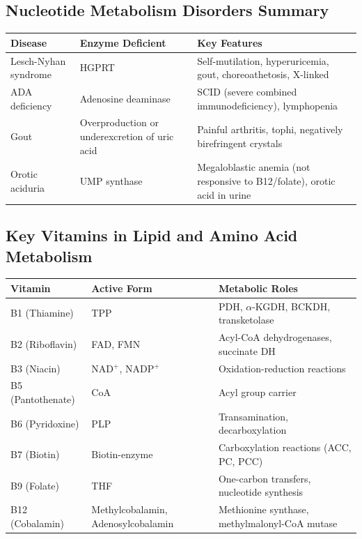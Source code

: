 \subsection{Nucleotide Metabolism Disorders Summary}

\begin{center}
\begin{tabular}{p{3.5cm}p{3.5cm}p{6.5cm}}
\toprule
\textbf{Disease} & \textbf{Enzyme Deficient} & \textbf{Key Features} \\
\midrule
Lesch-Nyhan syndrome & HGPRT & Self-mutilation, hyperuricemia, gout, choreoathetosis, X-linked \\
ADA deficiency & Adenosine deaminase & SCID (severe combined immunodeficiency), lymphopenia \\
Gout & Overproduction or underexcretion of uric acid & Painful arthritis, tophi, negatively birefringent crystals \\
Orotic aciduria & UMP synthase & Megaloblastic anemia (not responsive to B12/folate), orotic acid in urine \\
\bottomrule
\end{tabular}
\end{center}

\subsection{Key Vitamins in Lipid and Amino Acid Metabolism}

\begin{center}
\begin{tabular}{p{3cm}p{4cm}p{6.5cm}}
\toprule
\textbf{Vitamin} & \textbf{Active Form} & \textbf{Metabolic Roles} \\
\midrule
B1 (Thiamine) & TPP & PDH, $\alpha$-KGDH, BCKDH, transketolase \\
B2 (Riboflavin) & FAD, FMN & Acyl-CoA dehydrogenases, succinate DH \\
B3 (Niacin) & NAD$^+$, NADP$^+$ & Oxidation-reduction reactions \\
B5 (Pantothenate) & CoA & Acyl group carrier \\
B6 (Pyridoxine) & PLP & Transamination, decarboxylation \\
B7 (Biotin) & Biotin-enzyme & Carboxylation reactions (ACC, PC, PCC) \\
B9 (Folate) & THF & One-carbon transfers, nucleotide synthesis \\
B12 (Cobalamin) & Methylcobalamin, Adenosylcobalamin & Methionine synthase, methylmalonyl-CoA mutase \\
\bottomrule
\end{tabular}
\end{center}

